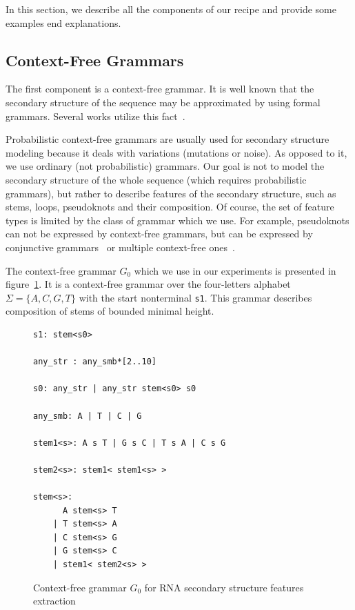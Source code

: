 \documentclass[a4paper,twoside]{article}
\begin{document}
In this section, we describe all the components of our recipe and provide some examples end explanations.
 
\subsection{Context-Free Grammars}

\noindent The first component is a context-free grammar. 
It is well known that the secondary structure of the sequence may be approximated by using formal grammars.
Several works utilize this fact~\cite{GrammarsRNA,LWPCFG,zier2013rna,knudsen2003pfold}.

Probabilistic context-free grammars are usually used for secondary structure modeling because it deals with variations (mutations or noise).
As opposed to it, we use ordinary (not probabilistic) grammars.
Our goal is not to model the secondary structure of the whole sequence (which requires probabilistic grammars), but rather to describe features of the secondary structure, such as stems, loops, pseudoknots and their composition.
Of course, the set of feature types is limited by the class of grammar which we use.
For example, pseudoknots can not be expressed by context-free grammars, but can be expressed by conjunctive grammars~\cite{KanchanDevi2017,zier2013rna,Okhotin:2001:CG:543313.543323} or multiple context-free ones~\cite{SEKI1991191,Riechert:2016:ADP:2972703.2972851}.

The context-free grammar $G_0$ which we use in our experiments is presented in figure~\ref{fig:cfg-rna}.
It is a context-free grammar over the four-letters alphabet $\Sigma=\{A,C,G,T\}$ with the start nonterminal \verb|s1|.
This grammar describes composition of stems of bounded minimal height.

\begin{figure}
\begin{verbatim}
s1: stem<s0>

any_str : any_smb*[2..10]

s0: any_str | any_str stem<s0> s0

any_smb: A | T | C | G

stem1<s>: A s T | G s C | T s A | C s G 

stem2<s>: stem1< stem1<s> >

stem<s>:  
      A stem<s> T 
    | T stem<s> A 
    | C stem<s> G 
    | G stem<s> C 
    | stem1< stem2<s> >  
\end{verbatim}
\caption{Context-free grammar $G_0$ for RNA secondary structure features extraction}
\label{fig:cfg-rna}
\end{figure}
\end{document}
